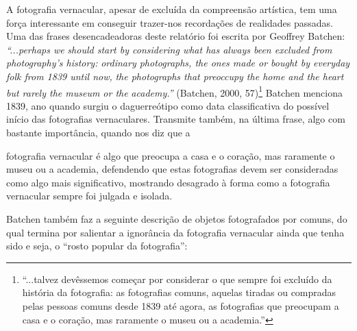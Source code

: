\documentclass{article}
\begin{document}
 
A fotografia vernacular, apesar de excluída da compreensão artística, tem uma 
força interessante em conseguir trazer-nos recordações de realidades passadas. Uma das 
frases desencadeadoras deste relatório foi escrita por Geoffrey Batchen: \textit{“...perhaps we }
\textit{should start by considering what has always been excluded from photography’s history: }
\textit{ordinary photographs, the ones made or bought by everyday folk from 1839 until now, }
\textit{the photographs that preoccupy the home and the heart but rarely the museum or the }
\textit{academy.”}  (Batchen,  2000,  57)\footnote{“...talvez devêssemos começar por considerar o que sempre foi excluído da história da fotografia: as fotografias comuns, aquelas tiradas ou compradas pelas pessoas comuns desde 1839 até agora, as fotografias que preocupam a casa e o coração, mas raramente o museu ou a academia.” }  Batchen  menciona  1839,  ano  quando  surgiu  o 
daguerreótipo  como  data  classificativa  do  possível  início  das  fotografias  vernaculares. 
Transmite também, na última frase, algo com bastante importância, quando nos diz que a 
 


 



fotografia vernacular é algo que preocupa a casa e o coração, mas raramente o museu ou 
a academia, defendendo que estas fotografias devem ser consideradas como algo mais 
significativo,  mostrando  desagrado  à  forma  como  a  fotografia  vernacular  sempre  foi 
julgada e isolada. 
 
Batchen também faz a seguinte descrição de objetos fotografados por comuns, do 
qual termina por salientar a ignorância da fotografia vernacular ainda que tenha sido e 
seja, o “rosto popular da fotografia”: 
\end{document}

